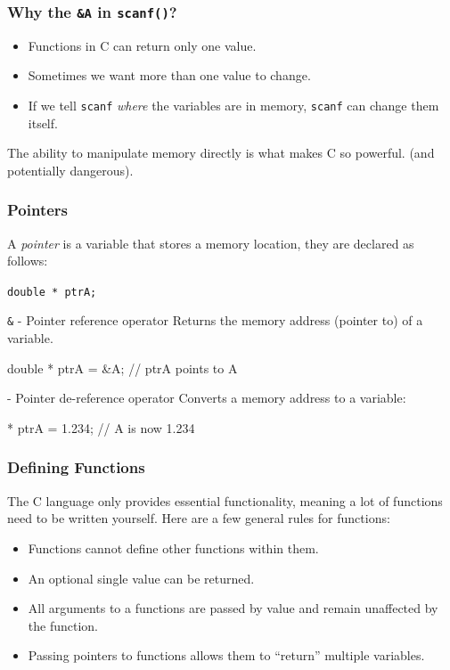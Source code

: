 \documentclass[table]{beamer}
\newif\ifschigh\schighfalse
\newcommand{\kw}[1]{\ifschigh\textcolor{red}{#1}\else\textcolor{keyword}{#1}\fi}
\newcommand{\kc}[1]{\ifschigh\textcolor{red}{#1}\else\textcolor{comment}{#1}\fi}
\begin{document}
\begin{frame}
\frametitle{Why the {\tt \&A} in {\tt scanf()}?}
\begin{itemize}
\item Functions in C can return only one value.
\item Sometimes we want more than one value to change.
\item If we tell {\tt scanf} \emph{where} the variables are in memory,
{\tt scanf} can change them itself.
\end{itemize}

\begin{alertblock}{}
The ability to manipulate memory directly is what makes C so powerful.
(and potentially dangerous).
\end{alertblock}
\end{frame}

{
\begin{frame}[fragile]
\frametitle{Pointers}
A \emph{pointer} is a variable that stores a memory location, they are declared as follows:
\begin{center}
\tt \kw{double} * ptrA;
\end{center}

\begin{block}{{\tt \&} - Pointer reference operator}
Returns the memory address (pointer to) of a variable.
\begin{semiverbatim}
   \kw{double} * ptrA = \&A;   \kc{// ptrA points to A}
\end{semiverbatim}
\end{block}

\begin{block}{{\tt *} - Pointer de-reference operator}
Converts a memory address to a variable:
\begin{semiverbatim}
   * ptrA  = 1.234;      \kc{// A is now 1.234}
\end{semiverbatim}
\end{block}

\end{frame}
}

\begin{frame}
\frametitle{Defining Functions}
The C language only provides essential functionality, meaning a lot of functions need to be written yourself. Here are a few general rules for functions:

\begin{itemize}
\item Functions cannot define other functions within them.
\item An optional single value can be returned.
\item All arguments to a functions are passed by value and remain unaffected by the function.
\item Passing pointers to functions allows them to ``return'' multiple variables.
\end{itemize}
\end{frame}
\end{document}

